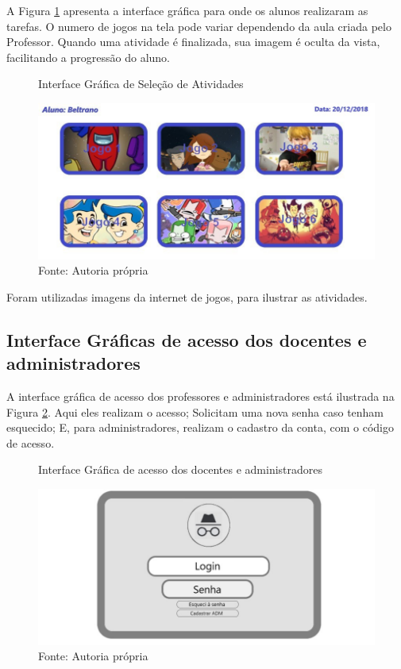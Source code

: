 \documentclass{utfpr-pg}
\begin{document}
        A Figura \ref{fig:3} apresenta a interface gráfica para onde os alunos realizaram as tarefas. O numero de jogos na tela pode variar dependendo da aula criada pelo Professor. Quando uma atividade é finalizada, sua imagem é oculta da vista, facilitando a progressão do aluno.
       
       
        \begin{figure}[H]
            \centering
            \captionsetup{width=0.9\textwidth}
            \caption{Interface Gráfica de Seleção de Atividades}
            \includegraphics[width=\linewidth]{fotos/3.jpg}
            \caption*{Fonte: Autoria própria}
            \label{fig:3}
        \end{figure}
        Foram utilizadas imagens da internet de jogos, para ilustrar as atividades.
   \subsection{Interface Gráficas de acesso dos docentes e administradores}
   
        A interface gráfica de acesso dos professores e administradores está ilustrada na Figura \ref{fig:4}. Aqui eles realizam o acesso; Solicitam uma nova senha caso tenham esquecido; E, para administradores, realizam o cadastro da conta, com o código de acesso.
       
        \begin{figure}[H]
            \centering
            \captionsetup{width=0.9\textwidth}
            \caption{Interface Gráfica de acesso dos docentes e administradores}
            \includegraphics[width=\linewidth]{fotos/4.jpg}
            \caption*{Fonte: Autoria própria}
            \label{fig:4}
        \end{figure}
        
\end{document}
